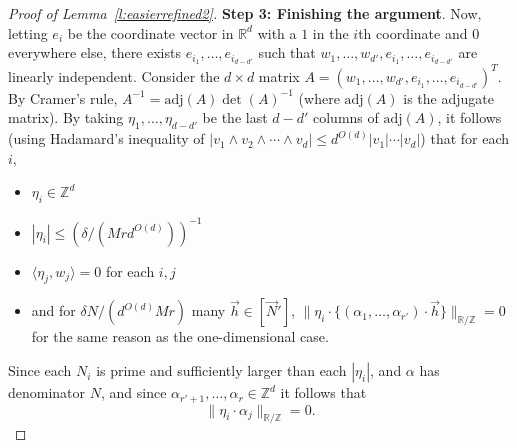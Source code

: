 \documentclass[11pt, a4paper]{amsart}
\theoremstyle{plain}
\theoremstyle{plain}
\theoremstyle{definition}
\theoremstyle{remark}
\numberwithin{equation}{section}
\numberwithin{lemma}{section}
\numberwithin{proposition}{section}
\numberwithin{corollary}{section}
\numberwithin{definition}{section}
\numberwithin{claim}{section}
\begin{document}
\begin{proof}[Proof of Lemma~\ref{l:easierrefined2}]
\textbf{Step 3: Finishing the argument}. Now, letting $e_i$ be the coordinate vector in $\mathbb{R}^{d}$ with a $1$ in the $i$th coordinate and $0$ everywhere else, there exists $e_{i_1}, \dots, e_{i_{d - d'}}$ such that $w_1, \dots, w_{d'}, e_{i_1}, \dots, e_{i_{d - d'}}$ are linearly independent. Consider the $d \times d$ matrix $A = (w_1, \dots, w_{d'}, e_{i_1}, \dots, e_{i_{d - d'}})^{T}$. By Cramer's rule, $A^{-1} = \text{adj}(A)\det(A)^{-1}$ (where $\text{adj}(A)$ is the adjugate matrix). By taking $\eta_1, \dots, \eta_{d - d'}$ be the last $d - d'$ columns of $\text{adj}(A)$, it follows (using Hadamard's inequality of $|v_1 \wedge v_2 \wedge \cdots \wedge v_d| \le d^{O(d)}|v_1| \cdots |v_d|$) that for each $i$,
\begin{itemize}
    \item $\eta_i \in \mathbb{Z}^d$
    \item $|\eta_i| \le (\delta/(Mrd^{O(d)}))^{-1}$
    \item $\langle \eta_j, w_j \rangle = 0$ for each $i, j$
    \item and for $\delta N/(d^{O(d)}Mr)$ many $\vec{h} \in [\vec{N}']$, $\|\eta_i \cdot \{(\alpha_1, \dots, \alpha_{r'}) \cdot \vec{h}\}\|_{\mathbb{R}/\mathbb{Z}} = 0$ for the same reason as the one-dimensional case.
\end{itemize}
Since each $N_i$ is prime and sufficiently larger than each $|\eta_i|$, and $\alpha$ has denominator $N$, and since $\alpha_{r' + 1}, \dots, \alpha_r \in \mathbb{Z}^d$ it follows that
$$\|\eta_i \cdot \alpha_j\|_{\mathbb{R}/\mathbb{Z}} = 0.$$
\end{proof}
\end{document}

